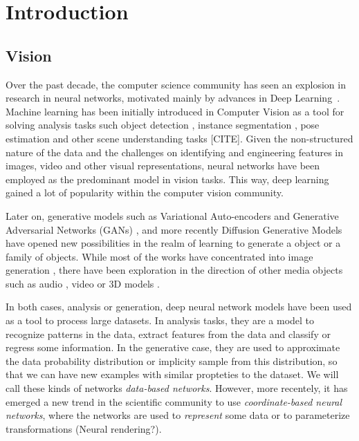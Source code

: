 \chapter{Introduction}

\section{Vision}

Over the past decade, the computer science community has seen an explosion in research in neural networks, motivated mainly by advances in Deep Learning~\cite{lecun2015deep,goodfellow2016deep}. Machine learning has been initially introduced in Computer Vision as a tool for solving analysis tasks such object detection \citep{redmon2016you}, instance segmentation \citep{he2017mask}, pose estimation \citep{cao2019openpose} and other scene understanding tasks [CITE]. Given the non-structured nature of the data and the challenges on identifying and engineering features in images, video and other visual representations, neural networks have been employed as the predominant model in vision tasks. This way, deep learning gained a lot of popularity within the computer vision community.

Later on, generative models such as Variational Auto-encoders \citep{kingma2014auto} and Generative Adversarial Networks (GANs) \citep{goodfellow2014generative}, and more recently Diffusion Generative Models \citep{ho2020denoising} have opened new possibilities in the realm of learning to generate a object or a family of objects. While most of the works have concentrated into image generation \citep{karras2017progressive}, there have been exploration in the direction of other media objects such as audio \citep{donahue2018adversarial}, video \citep{vondrick2016generating} or 3D models \citep{wu2016shapenets}.

In both cases, analysis or generation, deep neural network models have been used as a tool to process large datasets. In analysis tasks, they are a model to recognize patterns in the data, extract features from the data and classify or regress some information. In the generative case, they are used to approximate the data probability distribution or implicity sample from this distribution, so that we can have new examples with similar propteties to the dataset. We will call these kinds of networks \textit{data-based networks}. However, more recentely, it has emerged a new trend in the scientific community to use \textit{coordinate-based neural networks}, where the networks are used to \textit{represent} some data or to parameterize transformations (Neural rendering?).

